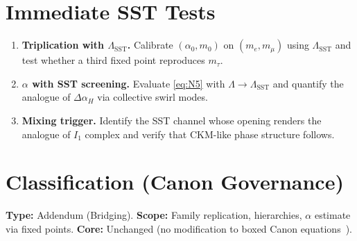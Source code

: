 \documentclass[11pt]{article}
\begin{document}
      \section{Immediate SST Tests}
      \begin{enumerate}
      \item \textbf{Triplication with $\Lambda_{\text{SST}}$.} Calibrate $(\alpha_0,m_0)$ on $(m_e,m_\mu)$ using $\Lambda_{\text{SST}}$ and test whether a third fixed point reproduces $m_\tau$.
      \item \textbf{$\alpha$ with SST screening.} Evaluate \cref{eq:N5} with $\Lambda\!\to\!\Lambda_{\text{SST}}$ and quantify the analogue of $\Delta\alpha_H$ via collective swirl modes.
      \item \textbf{Mixing trigger.} Identify the SST channel whose opening renders the analogue of $I_1$ complex and verify that CKM-like phase structure follows.
      \end{enumerate}

      \section*{Classification (Canon Governance)}
      \textbf{Type:} Addendum (Bridging). \quad
      \textbf{Scope:} Family replication, hierarchies, $\alpha$ estimate via fixed points. \quad
      \textbf{Core:} Unchanged (no modification to boxed Canon equations~\cite{SSTCanon2025}).

      
      





  \ifdefined\standalonechapter\else
  
  
\end{document}
